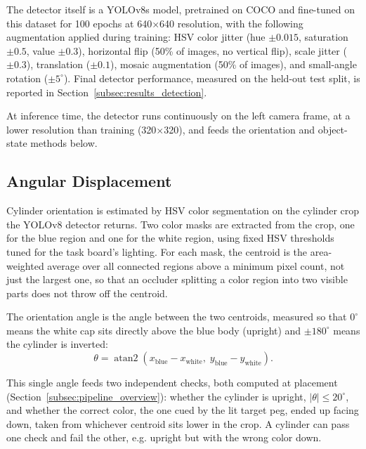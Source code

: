 The detector itself is a YOLOv8s model, pretrained on COCO and
fine-tuned on this dataset for 100 epochs at 640$\times$640
resolution, with the following augmentation applied during training:
HSV color jitter (hue $\pm 0.015$, saturation $\pm 0.5$, value $\pm
0.3$), horizontal flip (50\% of images, no vertical flip), scale
jitter ($\pm 0.3$), translation ($\pm 0.1$), mosaic augmentation
(50\% of images), and small-angle rotation ($\pm 5^\circ$).
Final detector performance, measured on the held-out test split, is
reported in Section~\ref{subsec:results_detection}.

At inference time, the detector runs continuously on the left camera
frame, at a lower resolution than training (320$\times$320), and
feeds the orientation and object-state methods below.

\subsection{Angular Displacement}
\label{subsec:angular_displacement}

Cylinder orientation is estimated by HSV color segmentation on the
cylinder crop the YOLOv8 detector returns. Two color masks are
extracted from the crop, one for the blue region and one for the
white region, using fixed HSV thresholds tuned for the task board's
lighting. For each mask, the centroid is the area-weighted average
over all connected regions above a minimum pixel count, not just the
largest one, so that an occluder splitting a color region into two
visible parts does not throw off the centroid.

The orientation angle is the angle between the two centroids,
measured so that $0^\circ$ means the white cap sits directly above
the blue body (upright) and $\pm 180^\circ$ means the cylinder is
inverted:
\begin{equation}
\theta = \operatorname{atan2}(x_{\text{blue}} - x_{\text{white}},\;
                               y_{\text{blue}} - y_{\text{white}}).
\end{equation}

This single angle feeds two independent checks, both computed at
placement (Section~\ref{subsec:pipeline_overview}): whether the
cylinder is upright, $|\theta| \le 20^\circ$, and whether the correct
color, the one cued by the lit target peg, ended up facing down,
taken from whichever centroid sits lower in the crop. A cylinder can
pass one check and fail the other, e.g. upright but with the wrong
color down.

